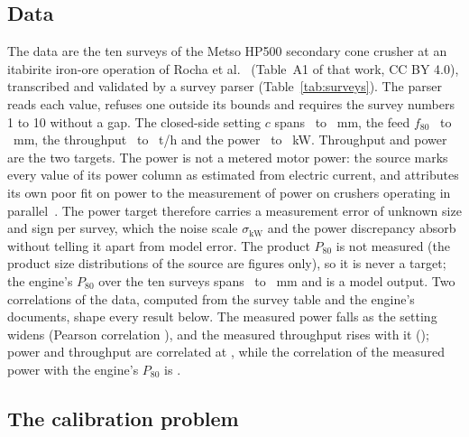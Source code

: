 \documentclass[journal]{IEEEtran}
\begin{document}
\subsection{Data}

The data are the ten surveys of the Metso HP500 secondary cone crusher at an itabirite iron-ore operation of Rocha et
al.~\cite{rocha} (Table~A1 of that work, CC BY 4.0), transcribed and validated by a survey parser
(Table~\ref{tab:surveys}). The parser reads each value, refuses one outside its bounds and requires the survey
numbers 1 to 10 without a gap. The closed-side setting $c$ spans \cssMin\ to \cssMax~mm, the feed
$f_{80}$ \fEightyMin\ to \fEightyMax~mm, the throughput \tphMMin\ to \tphMMax~t/h and the power \kwMMin\ to
\kwMMax~kW. Throughput and power are the two targets. The power is not a metered motor power: the source marks every
value of its power column as estimated from electric current, and attributes its own poor fit on power to the measurement
of power on crushers operating in parallel~\cite{rocha}. The power target therefore carries a measurement error of unknown
size and sign per survey, which the noise scale $\sigma_{\mathrm{kW}}$ and the power discrepancy absorb without telling
it apart from model error. The product $P_{80}$ is not measured (the product size distributions
of the source are figures only), so it is never a target; the engine's $P_{80}$ over the ten surveys spans
\peightyMin\ to \peightyMax~mm and is a model output. Two correlations of the data, computed from the survey table and the engine's documents, shape every result below. The measured
power falls as the setting widens (Pearson correlation \rMeasCss), and the measured throughput rises with it
(\rTphCss); power and throughput are correlated at \rKwTph{}, while the correlation of the measured power with the
engine's $P_{80}$ is \rKwPeighty.

\begin{table}[!t]
\caption{The ten HP500 surveys of Rocha et al. (Table A1, CC BY 4.0): closed-side setting, feed $f_{80}$, throughput and power of each survey, the power estimated by the source from electric current.}
\label{tab:surveys}
\centering\footnotesize

\end{table}

\subsection{The calibration problem}
\end{document}

